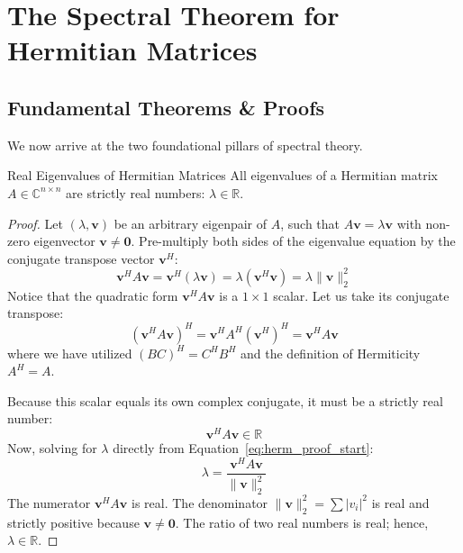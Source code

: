\section{The Spectral Theorem for Hermitian Matrices}

\subsection{Fundamental Theorems \& Proofs}
We now arrive at the two foundational pillars of spectral theory.

\begin{theorembox}{Real Eigenvalues of Hermitian Matrices}
\label{thm:real_eigenvalues}
All eigenvalues of a Hermitian matrix $A \in \mathbb{C}^{n \times n}$ are strictly real numbers: $\lambda \in \mathbb{R}$.
\end{theorembox}

\begin{proof}
Let $(\lambda, \mathbf{v})$ be an arbitrary eigenpair of $A$, such that $A\mathbf{v} = \lambda \mathbf{v}$ with non-zero eigenvector $\mathbf{v} \ne \mathbf{0}$.
Pre-multiply both sides of the eigenvalue equation by the conjugate transpose vector $\mathbf{v}^H$:
\begin{equation}
\mathbf{v}^H A \mathbf{v} = \mathbf{v}^H (\lambda \mathbf{v}) = \lambda (\mathbf{v}^H \mathbf{v}) = \lambda \|\mathbf{v}\|_2^2
\label{eq:herm_proof_start}
\end{equation}
Notice that the quadratic form $\mathbf{v}^H A \mathbf{v}$ is a $1 \times 1$ scalar. Let us take its conjugate transpose:
\begin{equation}
(\mathbf{v}^H A \mathbf{v})^H = \mathbf{v}^H A^H (\mathbf{v}^H)^H = \mathbf{v}^H A \mathbf{v}
\end{equation}
where we have utilized $(BC)^H = C^H B^H$ and the definition of Hermiticity $A^H = A$.

Because this scalar equals its own complex conjugate, it must be a strictly real number:
\begin{equation}
\mathbf{v}^H A \mathbf{v} \in \mathbb{R}
\end{equation}
Now, solving for $\lambda$ directly from Equation~\eqref{eq:herm_proof_start}:
\begin{equation}
\lambda = \frac{\mathbf{v}^H A \mathbf{v}}{\|\mathbf{v}\|_2^2}
\label{eq:rayleigh_quotient_eval}
\end{equation}
The numerator $\mathbf{v}^H A \mathbf{v}$ is real. The denominator $\|\mathbf{v}\|_2^2 = \sum |v_i|^2$ is real and strictly positive because $\mathbf{v} \ne \mathbf{0}$. The ratio of two real numbers is real; hence, $\lambda \in \mathbb{R}$.
\end{proof}

